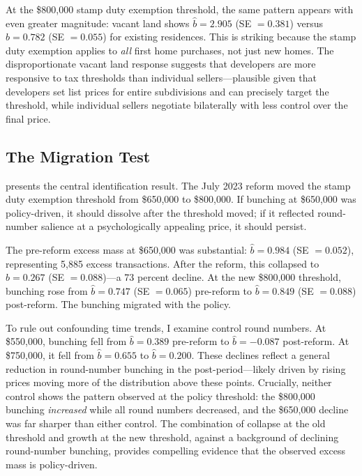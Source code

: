 \documentclass[12pt]{article}
\begin{document}
At the \$800,000 stamp duty exemption threshold, the same pattern appears with even greater magnitude: vacant land shows $\hat{b} = 2.905$ (SE $= 0.381$) versus $\hat{b} = 0.782$ (SE $= 0.055$) for existing residences. This is striking because the stamp duty exemption applies to \textit{all} first home purchases, not just new homes. The disproportionate vacant land response suggests that developers are more responsive to tax thresholds than individual sellers---plausible given that developers set list prices for entire subdivisions and can precisely target the threshold, while individual sellers negotiate bilaterally with less control over the final price.


\subsection{The Migration Test}

 presents the central identification result. The July 2023 reform moved the stamp duty exemption threshold from \$650,000 to \$800,000. If bunching at \$650,000 was policy-driven, it should dissolve after the threshold moved; if it reflected round-number salience at a psychologically appealing price, it should persist.

The pre-reform excess mass at \$650,000 was substantial: $\hat{b} = 0.984$ (SE $= 0.052$), representing 5,885 excess transactions. After the reform, this collapsed to $\hat{b} = 0.267$ (SE $= 0.088$)---a 73 percent decline. At the new \$800,000 threshold, bunching rose from $\hat{b} = 0.747$ (SE $= 0.065$) pre-reform to $\hat{b} = 0.849$ (SE $= 0.088$) post-reform. The bunching migrated with the policy.

To rule out confounding time trends, I examine control round numbers. At \$550,000, bunching fell from $\hat{b} = 0.389$ pre-reform to $\hat{b} = -0.087$ post-reform. At \$750,000, it fell from $\hat{b} = 0.655$ to $\hat{b} = 0.200$. These declines reflect a general reduction in round-number bunching in the post-period---likely driven by rising prices moving more of the distribution above these points. Crucially, neither control shows the pattern observed at the policy threshold: the \$800,000 bunching \textit{increased} while all round numbers decreased, and the \$650,000 decline was far sharper than either control. The combination of collapse at the old threshold and growth at the new threshold, against a background of declining round-number bunching, provides compelling evidence that the observed excess mass is policy-driven.
\end{document}
